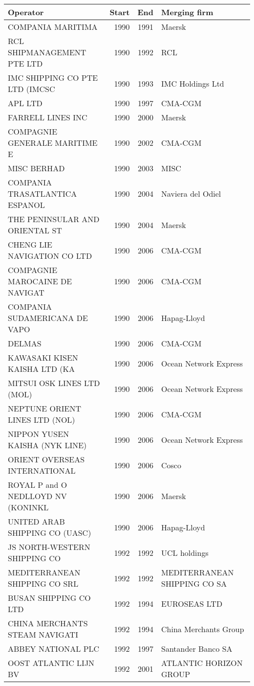 
\begin{tabular}[t]{lrrl}
\toprule
Operator & Start & End & Merging firm\\
\midrule
COMPANIA MARITIMA & 1990 & 1991 & Maersk\\
RCL SHIPMANAGEMENT PTE LTD & 1990 & 1992 & RCL\\
IMC SHIPPING CO PTE LTD (IMCSC & 1990 & 1993 & IMC Holdings Ltd\\
APL LTD & 1990 & 1997 & CMA-CGM\\
FARRELL LINES INC & 1990 & 2000 & Maersk\\
COMPAGNIE GENERALE MARITIME E & 1990 & 2002 & CMA-CGM\\
MISC BERHAD & 1990 & 2003 & MISC\\
COMPANIA TRASATLANTICA ESPANOL & 1990 & 2004 & Naviera del Odiel\\
THE PENINSULAR AND ORIENTAL ST & 1990 & 2004 & Maersk\\
CHENG LIE NAVIGATION CO LTD & 1990 & 2006 & CMA-CGM\\
COMPAGNIE MAROCAINE DE NAVIGAT & 1990 & 2006 & CMA-CGM\\
COMPANIA SUDAMERICANA DE VAPO & 1990 & 2006 & Hapag-Lloyd\\
DELMAS & 1990 & 2006 & CMA-CGM\\
KAWASAKI KISEN KAISHA LTD (KA & 1990 & 2006 & Ocean Network Express\\
MITSUI OSK LINES LTD (MOL) & 1990 & 2006 & Ocean Network Express\\
NEPTUNE ORIENT LINES LTD (NOL) & 1990 & 2006 & CMA-CGM\\
NIPPON YUSEN KAISHA (NYK LINE) & 1990 & 2006 & Ocean Network Express\\
ORIENT OVERSEAS INTERNATIONAL & 1990 & 2006 & Cosco\\
ROYAL P and O NEDLLOYD NV (KONINKL & 1990 & 2006 & Maersk\\
UNITED ARAB SHIPPING CO (UASC) & 1990 & 2006 & Hapag-Lloyd\\
JS NORTH-WESTERN SHIPPING CO & 1992 & 1992 & UCL holdings\\
MEDITERRANEAN SHIPPING CO SRL & 1992 & 1992 & MEDITERRANEAN SHIPPING CO SA\\
BUSAN SHIPPING CO LTD & 1992 & 1994 & EUROSEAS LTD\\
CHINA MERCHANTS STEAM NAVIGATI & 1992 & 1994 & China Merchants Group\\
ABBEY NATIONAL PLC & 1992 & 1997 & Santander Banco SA\\
OOST ATLANTIC LIJN BV & 1992 & 2001 & ATLANTIC HORIZON GROUP\\

\end{tabular}
